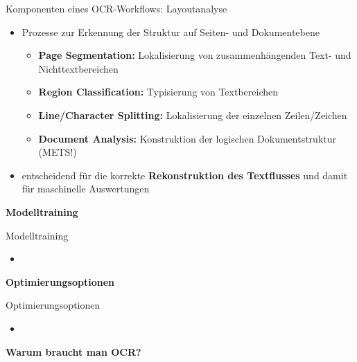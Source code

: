 \documentclass{bbawslides}
\begin{document}
\begin{bbawslide}{Komponenten eines OCR-Workflows: Layoutanalyse}
  \vspace*{7mm}%
  \centerslidestrue%
  \begin{itemize}
    \item Prozesse zur Erkennung der Struktur auf Seiten- und Dokumentebene
    \begin{itemize}\small
      \item \textbf{Page Segmentation:} Lokalisierung von zusammenhängenden Text- und Nichttextbereichen
      \item \textbf{Region Classification:} Typisierung von Textbereichen
      \item \textbf{Line/Character Splitting:} Lokalisierung der einzelnen Zeilen/Zeichen
      \item \textbf{Document Analysis:} Konstruktion der logischen Dokumentstruktur (METS!)
    \end{itemize}
    \item entscheidend für die korrekte \textbf{Rekonstruktion des Textflusses} und damit für maschinelle Auswertungen
  \end{itemize}
\end{bbawslide}

\begin{bbawpart}{\Large\bf Modelltraining}
\end{bbawpart}

\begin{bbawslide}{Modelltraining}
  \vspace*{7mm}%
  \centerslidestrue%
  \begin{itemize}
    \item
  \end{itemize}
\end{bbawslide}

\begin{bbawpart}{\Large\bf Optimierungsoptionen}
\end{bbawpart}

\begin{bbawslide}{Optimierungsoptionen}
  \vspace*{7mm}%
  \centerslidestrue%
  \begin{itemize}
    \item
  \end{itemize}
\end{bbawslide}

\begin{bbawpart}{\Large\bf Warum braucht man OCR?}
\end{bbawpart}
\end{document}
